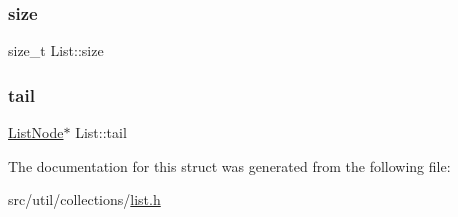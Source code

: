 \subsubsection{\texorpdfstring{size}{size}}
{\footnotesize\ttfamily size\+\_\+t List\+::size}

\hypertarget{structList_ac9c40d39dbdc778b9ca6264ac889e0b6}{}\label{structList_ac9c40d39dbdc778b9ca6264ac889e0b6} 
\subsubsection{\texorpdfstring{tail}{tail}}
{\footnotesize\ttfamily \hyperlink{structListNode}{List\+Node}$\ast$ List\+::tail}



The documentation for this struct was generated from the following file\+:\begin{DoxyCompactItemize}
\item 
src/util/collections/\hyperlink{list_8h}{list.\+h}\end{DoxyCompactItemize}
